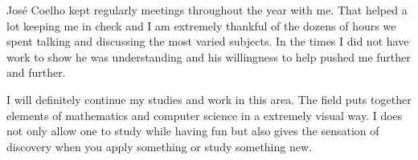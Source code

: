 José Coelho kept regularly meetings throughout the year with me. That helped a lot keeping me in check and I am extremely thankful of the dozens of hours we spent talking and discussing the most varied subjects. In the times I did not have work to show he was understanding and his willingness to help pushed me further and further. 

I will definitely continue my studies and work in this area. The field puts together elements of mathematics and computer science in a extremely visual way. I does not only allow one to study while having fun but also gives the sensation of discovery when you apply something or study something new.









